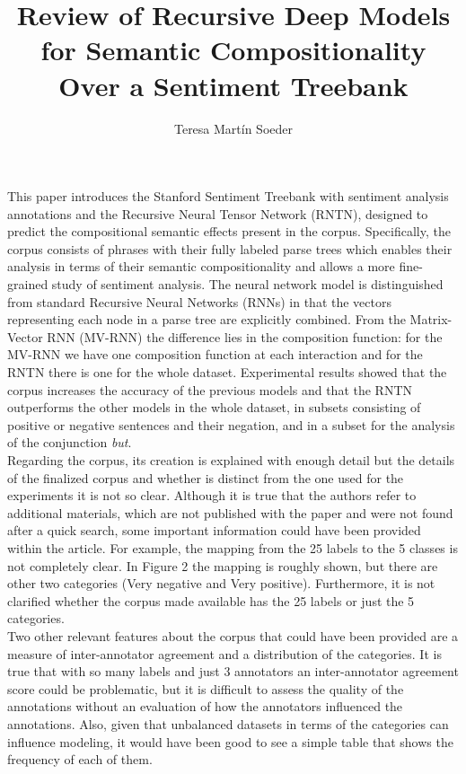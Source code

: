 \documentclass[11pt,a4paper]{article}
\title{Review of Recursive Deep Models for Semantic Compositionality Over a Sentiment Treebank \citep{socher2013recursive}}
\date{}
\author{Teresa Martín Soeder}
\begin{document}
\maketitle

This paper introduces the Stanford Sentiment Treebank with sentiment analysis annotations and the Recursive Neural Tensor Network (RNTN), designed to predict the compositional semantic effects present in the corpus. Specifically, the corpus consists of phrases with their fully labeled parse trees which enables their analysis in terms of their semantic compositionality and allows a more fine-grained study of sentiment analysis. The neural network model is distinguished from standard Recursive Neural Networks (RNNs) in that the vectors representing each node in a parse tree are explicitly combined. From the Matrix-Vector RNN (MV-RNN) the difference lies in the composition function: for the MV-RNN we have one composition function at each interaction and for the RNTN there is one for the whole dataset. Experimental results showed that the corpus increases the accuracy of the previous models and that the RNTN outperforms the other models in the whole dataset, in subsets consisting of positive or negative sentences and their negation, and in a subset for the analysis of the conjunction \textit{but}.\\

Regarding the corpus, its creation is explained with enough detail but the details of the finalized corpus and whether is distinct from the one used for the experiments it is not so clear. Although it is true that the authors refer to additional materials, which are not published with the paper and were not found after a quick search, some important information could have been provided within the article. For example, the mapping from the 25 labels to the 5 classes is not completely clear. In Figure 2 the mapping is roughly shown, but there are other two categories (Very negative and Very positive). Furthermore, it is not clarified whether the corpus made available has the 25 labels or just the 5 categories.\\

Two other relevant features about the corpus that could have been provided are a measure of inter-annotator agreement and a distribution of the categories. It is true that with so many labels and just 3 annotators an inter-annotator agreement score could be problematic, but it is difficult to assess the quality of the annotations without an evaluation of how the annotators influenced the annotations. Also, given that unbalanced datasets in terms of the categories can influence modeling, it would have been good to see a simple table that shows the frequency of each of them.\\
\end{document}
